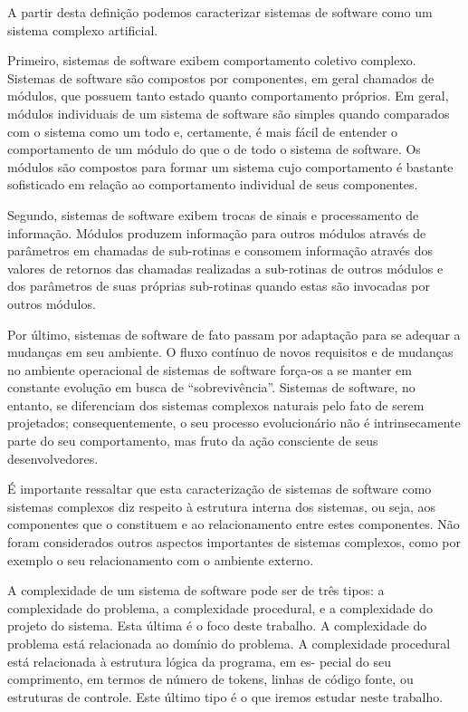 A partir desta definição podemos caracterizar sistemas de software como um
sistema complexo artificial.

Primeiro, sistemas de software exibem comportamento coletivo complexo. Sistemas
de software são compostos por componentes, em geral chamados de módulos, que
possuem tanto estado quanto comportamento próprios. Em geral, módulos
individuais de um sistema de software são simples quando comparados com o
sistema como um todo e, certamente, é mais fácil de entender o comportamento de
um módulo do que o de todo o sistema de software. Os módulos são compostos para
formar um sistema cujo comportamento é bastante sofisticado em relação ao
comportamento individual de seus componentes.

Segundo, sistemas de software exibem trocas de sinais e processamento de informação.
Módulos produzem informação para outros módulos através de parâmetros em chamadas
de sub-rotinas e consomem informação através dos valores de retornos das chamadas
realizadas a sub-rotinas de outros módulos e dos parâmetros de suas próprias sub-rotinas
quando estas são invocadas por outros módulos.

Por último, sistemas de software de fato passam por adaptação para se adequar a
mudanças em seu ambiente. O fluxo contínuo de novos requisitos e de mudanças no
ambiente operacional de sistemas de software força-os a se manter em constante
evolução em busca de “sobrevivência”. Sistemas de software, no entanto, se
diferenciam dos sistemas complexos naturais pelo fato de serem projetados;
consequentemente, o seu processo evolucionário não é intrinsecamente parte do
seu comportamento, mas fruto da ação consciente de seus desenvolvedores.

É importante ressaltar que esta caracterização de sistemas de software como
sistemas complexos diz respeito à estrutura interna dos sistemas, ou seja, aos
componentes que o constituem e ao relacionamento entre estes componentes. Não
foram considerados outros aspectos importantes de sistemas complexos, como por
exemplo o seu relacionamento com o ambiente externo.

A complexidade de um sistema de software pode ser de três tipos: a complexidade
do problema, a complexidade procedural, e a complexidade do projeto do sistema.
Esta última é o foco deste trabalho.
A complexidade do problema está relacionada ao domínio do problema.
A complexidade procedural está relacionada à estrutura lógica da programa, em es-
pecial do seu comprimento, em termos de número de tokens, linhas de código fonte, ou
estruturas de controle. Este último tipo é o que iremos estudar neste trabalho.

